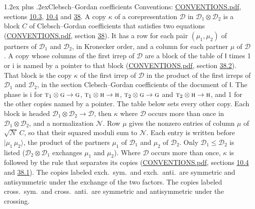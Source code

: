 \documentclass[10pt,a4paper]{article}
\makeatletter
\renewcommand\section{\@startsection{section}{1}{\z@}{-3ex plus -1ex minus -.2ex}%
  {1.2ex plus .2ex}{\normalfont\large\sffamily\bfseries\color{parttitle}}}
\numberwithin{equation}{section}
\newcommand{\grp}[1]{\mathsf{#1}}
\newcommand{\irr}[1]{\text{\normalfont\scshape #1}}
\newcommand{\iunit}{\mathrm{i}}
\newcommand{\irrprod}{\otimes}
\newcommand{\mult}{\kappa}
\newcommand{\intx}{\mu}
\newcommand{\cgnorm}{\mathcal{N}}
\newcommand{\prodket}[2]{\lvert {#1}\,{#2}\rangle}
\makeatother
\begin{document}
\section{Clebsch--Gordan coefficients}\label{s:clebsch_gordan}
Conventions: \href{../../CONVENTIONS.pdf}{CONVENTIONS.pdf}, sections \href{../../../rotation/CONVENTIONS.pdf\#conv.10.3}{10.3}, \href{../../../rotation/CONVENTIONS.pdf\#conv.10.4}{10.4} and \href{../../CONVENTIONS.pdf\#conv.38}{38}.
\leavevmode\label{n:index.copy}\label{n:matrix.cg.stored}A copy $\mult$ of a corepresentation $\mathcal{D}$ in $\mathcal{D}_1\irrprod\mathcal{D}_2$ is a block $C$ of Clebsch--Gordan coefficients that satisfies two equations (\href{../../CONVENTIONS.pdf}{CONVENTIONS.pdf}, section \href{../../CONVENTIONS.pdf\#conv.38}{38}). \label{n:index.cg}It has a row for each pair $(\intx_1, \intx_2)$ of partners of $\mathcal{D}_1$ and $\mathcal{D}_2$, in Kronecker order, and a column for each partner $\intx$ of $\mathcal{D}$.
A copy whose columns of the first irrep of $\mathcal{D}$ are a block of the table of $\grp{I}$ times 1 or $\iunit$ is named by a pointer to that block (\href{../../CONVENTIONS.pdf}{CONVENTIONS.pdf}, section \href{../../CONVENTIONS.pdf\#conv.38.2}{38.2}). That block is the copy $\mult$ of the first irrep of $\mathcal{D}$ in the product of the first irreps of $\mathcal{D}_1$ and $\mathcal{D}_2$, in the section Clebsch--Gordan coefficients of the document of \href{../../../rotation/data/pdf/I.pdf}{$\grp{I}$}. The phase is $\iunit$ for $\irr{t}_{1}\irrprod \irr{g}\to \irr{g}$, $\irr{t}_{1}\irrprod \irr{h}\to \irr{h}$, $\irr{t}_{2}\irrprod \irr{g}\to \irr{g}$ and $\irr{t}_{2}\irrprod \irr{h}\to \irr{h}$, and 1 for the other copies named by a pointer. The table below sets every other copy.
Each block is headed $\mathcal{D}_1\irrprod\mathcal{D}_2\to\mathcal{D}$, then $\mult$ where $\mathcal{D}$ occurs more than once in $\mathcal{D}_1\irrprod\mathcal{D}_2$, and a normalization $\cgnorm$. Row $\intx$ gives the nonzero entries of column $\intx$ of $\sqrt{\cgnorm}\,C$, so that their squared moduli sum to $\cgnorm$. \label{n:vector.ket.product}Each entry is written before $\prodket{\intx_1}{\intx_2}$, the product of the partners $\intx_1$ of $\mathcal{D}_1$ and $\intx_2$ of $\mathcal{D}_2$. Only $\mathcal{D}_1 \le \mathcal{D}_2$ is listed ($\mathcal{D}_2\irrprod\mathcal{D}_1$ exchanges $\intx_1$ and $\intx_2$).
Where $\mathcal{D}$ occurs more than once, $\mult$ is followed by the rule that separates its copies (\href{../../CONVENTIONS.pdf}{CONVENTIONS.pdf}, sections \href{../../../rotation/CONVENTIONS.pdf\#conv.10.4}{10.4} and \href{../../CONVENTIONS.pdf\#conv.38.1}{38.1}). \label{n:abbreviation.exchange}The copies labeled exch.\ sym.\ and exch.\ anti.\ are symmetric and antisymmetric under the exchange of the two factors. \label{n:abbreviation.crossing}The copies labeled cross.\ sym.\ and cross.\ anti.\ are symmetric and antisymmetric under the crossing.
\end{document}
